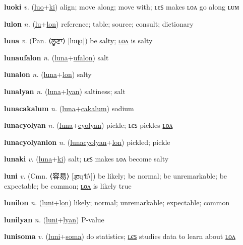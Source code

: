 \textbf{\hypertarget{luoki}{luoki}} \textit{v.} (\hyperlink{luo}{luo}+\allowbreak \hyperlink{ki}{ki})
align; move along; move with; ʟєꜱ makes ʟᴏᴧ go along ʟᴜᴍ

\textbf{\hypertarget{lulon}{lulon}} \textit{n.} (\hyperlink{lu}{lu}+\allowbreak \hyperlink{lon}{lon})
reference; table; source; consult; dictionary

\textbf{\hypertarget{luna}{luna}} \textit{v.} (Pan. ⟨{\gurmukhi{}ਲੂਣਾ}⟩ [luɳɑ])
be salty; \hyperlink{lunalon}{ʟᴏᴧ} is salty

\textbf{\hypertarget{lunaufalon}{lunaufalon}} \textit{n.} (\hyperlink{luna}{luna}+\allowbreak \hyperlink{ufalon}{ufalon})
salt

\textbf{\hypertarget{lunalon}{lunalon}} \textit{n.} (\hyperlink{luna}{luna}+\allowbreak \hyperlink{lon}{lon})
salty

\textbf{\hypertarget{lunalyan}{lunalyan}} \textit{n.} (\hyperlink{luna}{luna}+\allowbreak \hyperlink{lyan}{lyan})
saltiness; salt

\textbf{\hypertarget{lunacakalum}{lunacakalum}} \textit{n.} (\hyperlink{luna}{luna}+\allowbreak \hyperlink{cakalum}{cakalum})
sodium

\textbf{\hypertarget{lunacyolyan}{lunacyolyan}} \textit{n.} (\hyperlink{luna}{luna}+\allowbreak \hyperlink{cyolyan}{cyolyan})
pickle; ʟєꜱ pickles \hyperlink{lunacyolyanlon}{ʟᴏᴧ}

\textbf{\hypertarget{lunacyolyanlon}{lunacyolyanlon}} \textit{n.} (\hyperlink{lunacyolyan}{lunacyolyan}+\allowbreak \hyperlink{lon}{lon})
pickled; pickle

\textbf{\hypertarget{lunaki}{lunaki}} \textit{v.} (\hyperlink{luna}{luna}+\allowbreak \hyperlink{ki}{ki})
salt; ʟєꜱ makes ʟᴏᴧ become salty

\textbf{\hypertarget{luni}{luni}} \textit{v.} (Cmn. ⟨{\chinese{}容易}⟩ [ɻʊŋ˧˥i˥˩])
be likely; be normal; be unremarkable; be expectable; be common; \hyperlink{lunilon}{ʟᴏᴧ} is likely true

\textbf{\hypertarget{lunilon}{lunilon}} \textit{n.} (\hyperlink{luni}{luni}+\allowbreak \hyperlink{lon}{lon})
likely; normal; unremarkable; expectable; common

\textbf{\hypertarget{lunilyan}{lunilyan}} \textit{n.} (\hyperlink{luni}{luni}+\allowbreak \hyperlink{lyan}{lyan})
P-value

\textbf{\hypertarget{lunisoma}{lunisoma}} \textit{v.} (\hyperlink{luni}{luni}+\allowbreak \hyperlink{soma}{soma})
do statistics; \hyperlink{lunisomales}{ʟєꜱ} studies data to learn about \hyperlink{lunisomalon}{ʟᴏᴧ}

